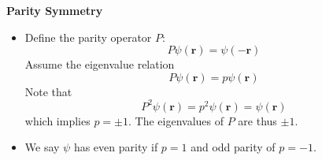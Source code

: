 \documentclass[11pt, a4paper]{article}
\renewcommand{\vec}[1]{\bm{#1}} %
\newcommand{\p}{\psi}  %
\renewcommand{\r}{\vec{r}}  %
\begin{document}
\textbf{Parity Symmetry}
\begin{itemize}
	\item Define the parity operator $ P $:
	\begin{equation*}
		P \p(\r) = \p(-\r)
	\end{equation*}
	Assume the eigenvalue relation
	\begin{equation*}
		P\p(\r) = p \p(\r)
	\end{equation*}
	Note that
	\begin{equation*}
		P^{2}\p(\r) = p^{2} \p(\r) = \p(\r)
	\end{equation*}
	which implies $ p = \pm 1 $. The eigenvalues of $ P $ are thus $ \pm 1 $. 
	
	\item We say $ \p $ has even parity if $ p = 1 $ and odd parity of $ p = - 1 $. 
\end{itemize}
\end{document}
